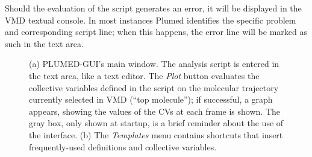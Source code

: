 \documentclass[preprint,review,11pt]{elsarticle}
\begin{document}
Should the evaluation of the script generates an error, it will be
displayed in the VMD textual console.  In most instances Plumed
identifies the specific problem and corresponding script line; when
this happens, the error line will be marked as such in the text area.



\begin{figure}
  \centering
  \caption{(a) PLUMED-GUI's main window.  The analysis script is
    entered in the text area, like a text editor. The \emph{Plot}
    button evaluates the collective variables defined in the script on
    the molecular trajectory currently selected in VMD (``top
    molecule''); if successful, a graph appears, showing the values of
    the CVs at each frame is shown. The gray box, only shown at
    startup, is a brief reminder about the use of the interface. (b)
    The \emph{Templates} menu contains shortcuts that insert
    frequently-used definitions and collective variables. }
\end{figure}
\end{document}
